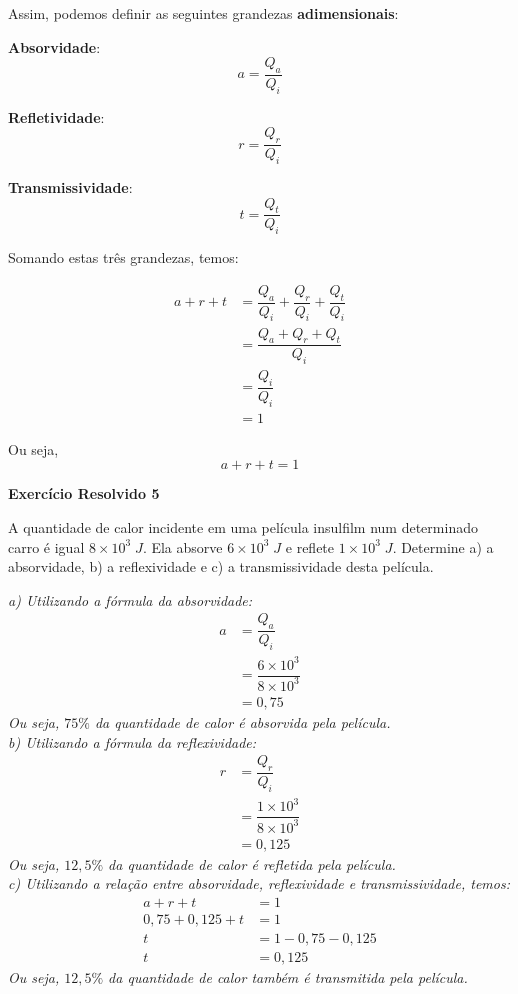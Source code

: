 \documentclass[12pt,twoside]{article}
\newenvironment{resposta*}
{\bf Resposta:\\ }
{}
\begin{document}
Assim, podemos definir as seguintes grandezas \textbf{adimensionais}:


\textbf{Absorvidade}:\[\boxed{a=\dfrac{Q_{a}}{Q_{i}}}\]


\textbf{Refletividade}:\[\boxed{r=\dfrac{Q_{r}}{Q_{i}}}\]


\textbf{Transmissividade}:\[\boxed{t=\dfrac{Q_{t}}{Q_{i}}}\]


Somando estas três grandezas, temos:


\begin{align*}
a+r+t &=\dfrac{Q_{a}}{Q_{i}} + \dfrac{Q_{r}}{Q_{i}} + \dfrac{Q_{t}}{Q_{i}} \\
&=\dfrac{Q_{a}+Q_{r}+Q_{t}}{Q_{i}} \\
&=\dfrac{Q_{i}}{Q_{i}} \\
&=1
\end{align*}


Ou seja, \[\boxed{a+r+t=1}\]


\textbf{Exercício Resolvido 5}


A quantidade de calor incidente em uma película insulfilm num determinado carro é igual $8\times 10^{3}\;J$. Ela absorve $6\times 10^{3}\;J$ e reflete $1\times 10^3\;J$. Determine a) a absorvidade, b) a reflexividade e c) a transmissividade desta película.


\begin{resposta*}
{\it a) Utilizando a fórmula da absorvidade:
\begin{align*}
a &= \dfrac{Q_{a}}{Q_{i}} \\
&=\dfrac{6\times 10^{3}}{8\times 10^{3}} \\
&={0,75}
\end{align*}
Ou seja, $\boxed{75\%}$ da quantidade de calor é absorvida pela película. \\
b) Utilizando a fórmula da reflexividade:
\begin{align*}
r &= \dfrac{Q_{r}}{Q_{i}} \\
&=\dfrac{1\times 10^{3}}{8\times 10^{3}} \\
&={0,125}
\end{align*}
Ou seja, $\boxed{12,5\%}$ da quantidade de calor é refletida pela película. \\
c) Utilizando a relação entre absorvidade, reflexividade e transmissividade, temos:
\begin{align*}
a+r+t &=1 \\
0,75+0,125+t &= 1 \\
t&=1-0,75-0,125 \\
t&=0,125
\end{align*}
Ou seja, $\boxed{12,5\%}$ da quantidade de calor também é transmitida pela película.}
\end{resposta*}
\end{document}
